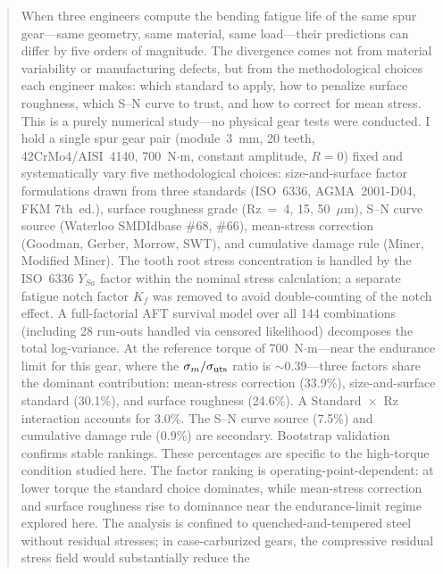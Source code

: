 \documentclass[12pt,a4paper]{article}
\begin{document}
\begin{abstract}
\label{sec:abstract}

When three engineers compute the bending fatigue life of the same spur
gear---same geometry, same material, same load---their predictions can
differ by five orders of magnitude. The divergence comes not from
material variability or manufacturing defects, but from the
methodological choices each engineer makes: which standard to apply, how
to penalize surface roughness, which S--N curve to trust, and how to
correct for mean stress. This is a purely numerical study---no
physical gear tests were conducted. I hold a single spur gear pair
(module~3~mm,%
20 teeth,%
42CrMo4/AISI~4140,%
700~N$\cdot$m,%
constant amplitude, $R=0$) fixed and systematically vary five methodological%
choices: size-and-surface factor formulations drawn from three standards
(ISO~6336, AGMA~2001-D04, FKM 7th~ed.), surface
roughness grade (Rz~=~4, 15, 50~$\mu$m), S--N curve source (Waterloo
SMDIdbase \#68, \#66), mean-stress correction (Goodman, Gerber, Morrow,
SWT), and cumulative damage rule (Miner, Modified Miner). The tooth
root stress concentration is handled by the ISO~6336 $Y_{Sa}$ factor
within the nominal stress calculation; a separate fatigue notch factor
$K_f$ was removed to avoid double-counting of the notch effect. A
full-factorial AFT survival model over all 144 combinations (including
28 run-outs handled via censored likelihood) decomposes the total
log-variance. At the reference torque of 700~N$\cdot$m---near the
endurance limit for this gear, where the $\sigma_m/\sigma_{\rm uts}$
ratio is $\sim$0.39---three factors share the dominant contribution:
mean-stress correction (33.9\%), size-and-surface standard (30.1\%), and
surface roughness (24.6\%). A Standard~$\times$~Rz interaction accounts
for 3.0\%. The S--N curve source (7.5\%) and cumulative damage rule
(0.9\%) are secondary. Bootstrap validation confirms stable
rankings.%
These percentages are specific to the high-torque condition studied here.
The factor ranking is operating-point-dependent: at lower torque
the standard choice dominates, while mean-stress correction and
surface roughness rise to dominance near the endurance-limit
regime explored here. The analysis is confined to quenched-and-tempered
steel without residual stresses; in case-carburized gears, the
compressive residual stress field would substantially reduce the

\end{abstract}
\end{document}
